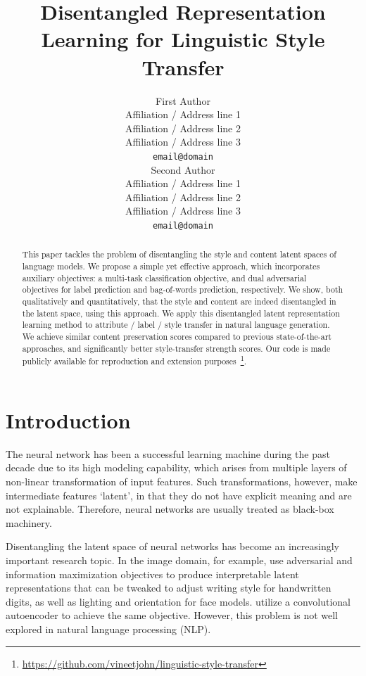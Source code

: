 \documentclass[11pt,a4paper]{article}
\title{Disentangled Representation Learning for Linguistic Style Transfer}
\author{First Author \\
  Affiliation / Address line 1 \\
  Affiliation / Address line 2 \\
  Affiliation / Address line 3 \\
  {\tt email@domain} \\\And
  Second Author \\
  Affiliation / Address line 1 \\
  Affiliation / Address line 2 \\
  Affiliation / Address line 3 \\
  {\tt email@domain} \\}
\date{}
\begin{document}
\maketitle

\graphicspath{{images/}}


\begin{abstract}
	This paper tackles the problem of disentangling the style and content latent spaces of language models. We propose a simple yet effective approach, which incorporates auxiliary objectives: a multi-task classification objective, and dual adversarial objectives for label prediction and bag-of-words prediction, respectively. We show, both qualitatively and quantitatively, that the style and content are indeed disentangled in the latent space, using this approach. We apply this disentangled latent representation learning method to attribute / label / style transfer in natural language generation. We achieve similar content preservation scores compared to previous state-of-the-art approaches, and significantly better style-transfer strength scores. Our code is made publicly available for reproduction and extension purposes~\footnote{\tiny{\url{https://github.com/vineetjohn/linguistic-style-transfer}}}.
\end{abstract}

% 

\section{Introduction}

The neural network has been a successful learning machine during the past decade due to its high modeling capability, which arises from multiple layers of non-linear transformation of input features. Such transformations, however, make intermediate features `latent', in that they do not have explicit meaning and are not explainable. Therefore, neural networks are usually treated as black-box machinery.

Disentangling the latent space of neural networks has become an increasingly important research topic. In the image domain, for example,  use adversarial and information maximization objectives to produce interpretable latent representations that can be tweaked to adjust writing style for handwritten digits, as well as lighting and orientation for face models.  utilize a convolutional autoencoder to achieve the same objective. However, this problem is not well explored in natural language processing (NLP).
\end{document}
